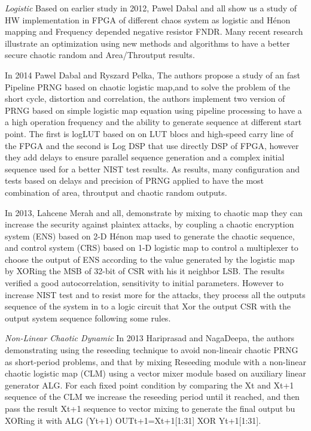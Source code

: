 \textit{Logistic} Based on earlier study in 2012, Pawel Dabal and all show us a study of HW implementation in FPGA of different chaos system as logistic and Hénon mapping and Frequency depended negative resistor FNDR. Many recent research illustrate an optimization using new methods and algorithms to have a better secure chaotic random and Area/Throutput results.

In 2014 Pawel Dabal and Ryszard Pelka, The authors propose a study of an fast Pipeline PRNG based on chaotic logistic map,and to solve the problem of the short cycle, distortion and correlation, the authors implement two version of PRNG based on simple logistic map equation using pipeline processing to have a a high operation frequency and the ability to generate sequence at different start point. The first is logLUT based on on LUT blocs and high-speed carry line of the FPGA and the second is Log DSP that use directly DSP of FPGA, however they add delays to ensure parallel sequence generation and a complex initial sequence used for a better NIST test results. As results, many configuration and tests based on delays and precision of PRNG applied to have the most combination of area, throutput and chaotic random outputs. 

In 2013, Lahcene Merah and all, demonstrate by mixing to chaotic map they can increase the security against plaintex attacks, by coupling a chaotic encryption system (ENS) based on 2-D Hénon map used to generate the chaotic sequence, and control system (CRS) based on 1-D logistic map to control a multiplexer to choose the output of ENS according to the value generated by the logistic map by XORing the MSB of 32-bit of CSR with his it neighbor LSB. The results verified a good autocorrelation, sensitivity to initial parameters. However to increase NIST test and to resist more for the attacks, they process all the outputs sequence of the system in to a logic circuit that Xor the output CSR with the output system sequence following some rules.

\textit{Non-Linear Chaotic Dynamic} In 2013 Hariprasad and NagaDeepa, the authors demonstrating using the reseeding technique to avoid non-lineair chaotic PRNG as short-period problems, and that by mixing Reseeding module with a non-linear chaotic logistic map (CLM) using a vector mixer module based on auxiliary linear generator ALG. For each fixed point condition by comparing the Xt and Xt+1 sequence of the CLM we increase the reseeding period until it reached, and then pass the result Xt+1 sequence to vector mixing to generate the final output bu XORing it with ALG (Yt+1) OUTt+1=Xt+1[1:31] XOR Yt+1[1:31].

